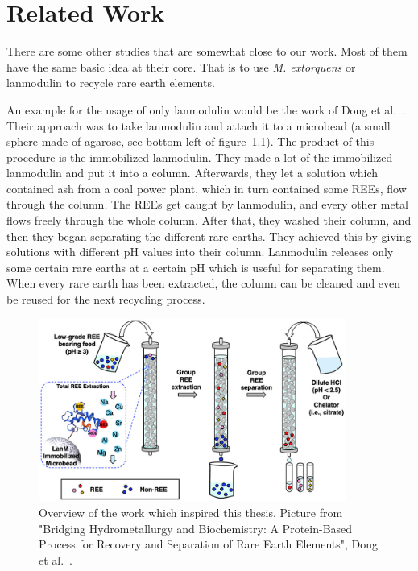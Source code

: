 \chapter{Related Work\authorA{}}

There are some other studies that are somewhat close to our work.
Most of them have the same basic idea at their core.
That is to use \emph{M. extorquens} or lanmodulin to recycle rare earth elements.

An example for the usage of only lanmodulin would be the work of Dong et al.~\cite{originalstudy}.
Their approach was to take lanmodulin and attach it to a microbead (a small sphere made of agarose, see bottom left of figure~\ref{fig:original_study_process}).
The product of this procedure is the immobilized lanmodulin.
They made a lot of the immobilized lanmodulin and put it into a column.
Afterwards, they let a solution which contained ash from a coal power plant, which in turn contained some REEs, flow through the column.
The REEs get caught by lanmodulin, and every other metal flows freely through the whole column.
After that, they washed their column, and then they began separating the different rare earths.
They achieved this by giving solutions with different pH values into their column.
Lanmodulin releases only some certain rare earths at a certain pH which is useful for separating them.
When every rare earth has been extracted, the column can be cleaned and even be reused for the next recycling process.

\begin{figure}[H]
    \centering
    \includegraphics[width=0.9\textwidth]{./media/images/original_study_process}
    \caption{Overview of the work which inspired this thesis.
    Picture from "Bridging Hydrometallurgy and Biochemistry:
    A Protein-Based Process for Recovery and Separation of Rare Earth Elements", Dong et al.~\cite{originalstudy}.}
    \label{fig:original_study_process}
\end{figure}


